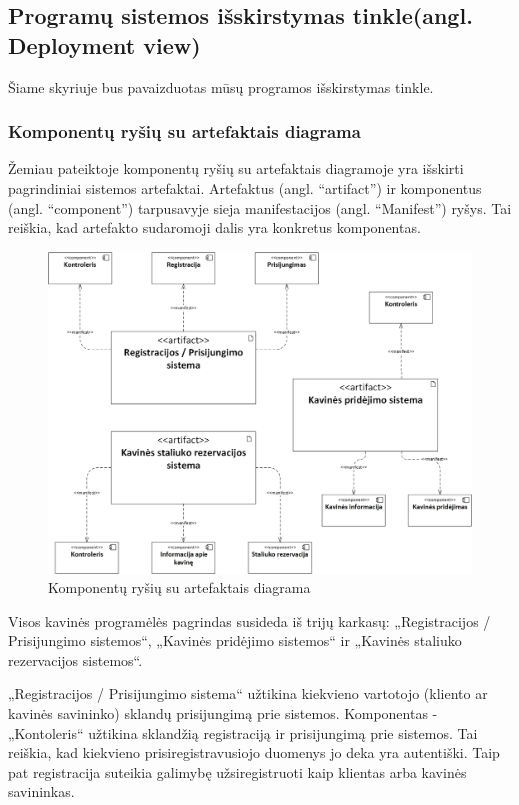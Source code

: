 \documentclass{VUMIFPSkursinis}
\begin{document}
\subsection{Programų sistemos išskirstymas tinkle(angl. Deployment view)}
Šiame skyriuje bus pavaizduotas mūsų programos išskirstymas tinkle.
\subsubsection{Komponentų ryšių su artefaktais diagrama}

Žemiau pateiktoje komponentų ryšių su artefaktais diagramoje yra išskirti pagrindiniai sistemos artefaktai. Artefaktus (angl. “artifact”) ir komponentus (angl. “component”) tarpusavyje sieja manifestacijos (angl. “Manifest”) ryšys. Tai reiškia, kad artefakto sudaromoji dalis yra konkretus komponentas.


\begin{figure}[H]
    \centering
    \includegraphics[width=\textwidth,height=\textheight,keepaspectratio]{img/Deployment_diagram1} 
    \caption{Komponentų ryšių su artefaktais diagrama}
    \label{img:Model}
\end{figure}




Visos kavinės programėlės pagrindas susideda iš trijų karkasų: „Registracijos / Prisijungimo sistemos“, „Kavinės pridėjimo sistemos“ ir „Kavinės staliuko rezervacijos sistemos“.

„Registracijos / Prisijungimo sistema“ užtikina kiekvieno vartotojo (kliento ar kavinės savininko) sklandų prisijungimą prie sistemos. Komponentas - „Kontoleris“ užtikina sklandžią registraciją ir prisijungimą prie sistemos. Tai reiškia, kad kiekvieno prisiregistravusiojo duomenys jo deka yra autentiški. Taip pat registracija suteikia galimybę užsiregistruoti kaip klientas arba kavinės savininkas.
\end{document}
